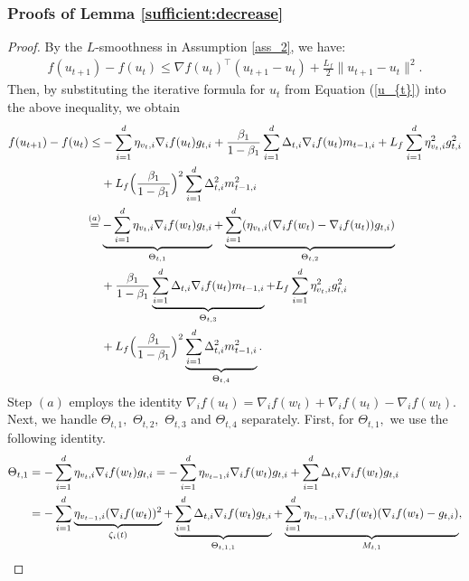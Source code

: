 \documentclass{article} %
\begin{document}
\subsubsection{Proofs of Lemma \ref{sufficient:decrease}}\label{proof of sufficient}
\begin{proof}
By the $L$-smoothness in Assumption \ref{ass_2}, we have:
\begin{align*}
f(u_{t+1})-f(u_{t})\le \nabla f(u_{t})^{\top}(u_{t+1}-u_{t})+\frac{L_{f}}{2}\|u_{t+1}-u_{t}\|^{2}.     
\end{align*}
Then, by substituting the iterative formula for \( u_{t} \) from Equation (\ref{u_{t}}) into the above inequality, we obtain
\begin{align}\label{adam_-1}
f(u_{t+1})-f(u_{t})\le & -\sum_{i=1}^{d}\eta_{v_{t},i}\nabla_{i} f(u_{t})g_{t,i}+\frac{\beta_{1}}{1-\beta_{1}}\sum_{i=1}^{d}\Delta_{t,i}\nabla_{i} f(u_{t})m_{t-1,i}+{L_{f}}\sum_{i=1}^{d}\eta_{v_{t},i}^{2}g_{t,i}^{2}\notag\\&+L_{f}\Big(\frac{\beta_{1}}{1-\beta_{1}}\Big)^{2}\sum_{i=1}^{d}\Delta_{t,i}^{2}m_{t-1,i}^{2}\notag\\
\mathop{=}^{(a)} &\underbrace{-\sum_{i=1}^{d}\eta_{v_{t},i}\nabla_{i}f(w_{t})g_{t,i}}_{\Theta_{t,1}}+\underbrace{\sum_{i=1}^{d}(\eta_{v_{t},i}(\nabla_{i}f(w_{t})-\nabla_{i}f(u_{t}))g_{t,i})}_{\Theta_{t,2}}\notag\\&+\frac{\beta_{1}}{1-\beta_{1}}\underbrace{\sum_{i=1}^{d}\Delta_{t,i}\nabla_{i} f(u_{t})m_{t-1,i}}_{\Theta_{t,3}}+{L_{f}}\sum_{i=1}^{d}\eta_{v_{t},i}^{2}g_{t,i}^{2}\notag\\&+L_{f}\Big(\frac{\beta_{1}}{1-\beta_{1}}\Big)^{2}\underbrace{\sum_{i=1}^{d}\Delta_{t,i}^{2}m_{t-1,i}^{2}}_{\Theta_{t,4}}.
\end{align}
Step $(a)$ employs the identity $\nabla_{i} f(u_{t})=\nabla_{i} f(w_{t}) + \nabla_{i} f(u_{t}) - \nabla_{i} f(w_{t}).$ Next, we handle $\Theta_{t,1},$ $\Theta_{t,2},$ $\Theta_{t,3}$ and $\Theta_{t,4}$ separately. First, for $\Theta_{t,1},$ we use the following identity.
\begin{align}\label{adam_0}
\Theta_{t,1}&=-\sum_{i=1}^{d}\eta_{v_{t},i}\nabla_{i}f(w_{t})g_{t,i}=-\sum_{i=1}^{d}\eta_{v_{t-1},i}\nabla_{i}f(w_{t})g_{t,i}+\sum_{i=1}^{d}\Delta_{t,i}\nabla_{i}f(w_{t})g_{t,i}\notag\\&=-\sum_{i=1}^{d}\underbrace{\eta_{v_{t-1},i}(\nabla_{i}f(w_{t}))^{2}}_{\zeta_{i}(t)}+\underbrace{\sum_{i=1}^{d}\Delta_{t,i}\nabla_{i}f(w_{t})g_{t,i}}_{\Theta_{t,1,1}}+\underbrace{\sum_{i=1}^{d}\eta_{v_{t-1},i}\nabla_{i}f(w_{t})(\nabla_{i} f(w_{t})-g_{t,i})}_{M_{t,1}},

\end{align}
\end{proof}
\end{document}
